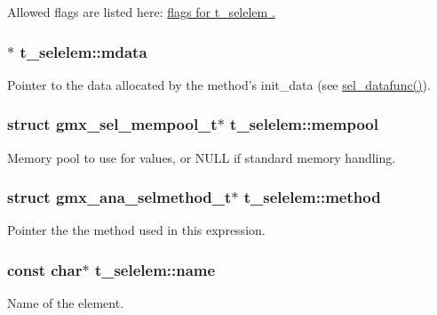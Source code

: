 \-Allowed flags are listed here\-: \hyperlink{selelem_8h_selelem_flags}{flags for {\ttfamily t\-\_\-selelem} .}\hypertarget{structt__selelem_a4d527b4b7880fc0555a73d218fe8c7e7}{
\subsubsection[{mdata}]{$\ast$ {\bf t\-\_\-selelem\-::mdata}}}\label{structt__selelem_a4d527b4b7880fc0555a73d218fe8c7e7}
\-Pointer to the data allocated by the method's {\ttfamily init\-\_\-data} (see \hyperlink{include_2selmethod_8h_a5acbf2d7bead71c4d96f9e69b267df56}{sel\-\_\-datafunc()}). \hypertarget{structt__selelem_a881bbe9a44c4643401cde02f6bca162e}{
\subsubsection[{mempool}]{\setlength{\rightskip}{0pt plus 5cm}struct {\bf gmx\-\_\-sel\-\_\-mempool\-\_\-t}$\ast$ {\bf t\-\_\-selelem\-::mempool}}}\label{structt__selelem_a881bbe9a44c4643401cde02f6bca162e}
\-Memory pool to use for values, or \-N\-U\-L\-L if standard memory handling. \hypertarget{structt__selelem_ab84029573c8caca4cc50d3dc290d3047}{
\subsubsection[{method}]{\setlength{\rightskip}{0pt plus 5cm}struct {\bf gmx\-\_\-ana\-\_\-selmethod\-\_\-t}$\ast$ {\bf t\-\_\-selelem\-::method}}}\label{structt__selelem_ab84029573c8caca4cc50d3dc290d3047}
\-Pointer the the method used in this expression. \hypertarget{structt__selelem_aea908029a2d5c85e438afb11451be9ba}{
\subsubsection[{name}]{\setlength{\rightskip}{0pt plus 5cm}const char$\ast$ {\bf t\-\_\-selelem\-::name}}}\label{structt__selelem_aea908029a2d5c85e438afb11451be9ba}


\-Name of the element. 

